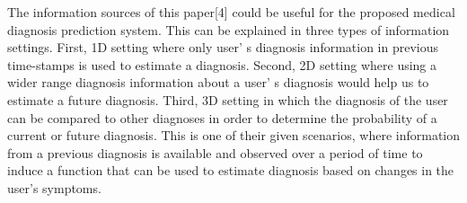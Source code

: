 \documentclass[sts]{sig-alternate}
\begin{document}
		The information sources of this paper[4] could be useful for the proposed medical diagnosis 				prediction system. This can be explained in three types of information settings. First, 1D 				setting where only user' s diagnosis information in previous time-stamps is used to estimate a 			diagnosis. Second, 2D setting where using a wider range diagnosis information about a user' s 			diagnosis would help us to estimate a future diagnosis. Third, 3D setting in which the diagnosis 		of the user can be compared to other diagnoses in order to determine the probability of a 				current or future diagnosis. This is one of their given scenarios, where information from a 				previous diagnosis is available and observed over a period of time to induce a function that can 		be used to estimate diagnosis based on changes in the user's symptoms.
\end{document}
